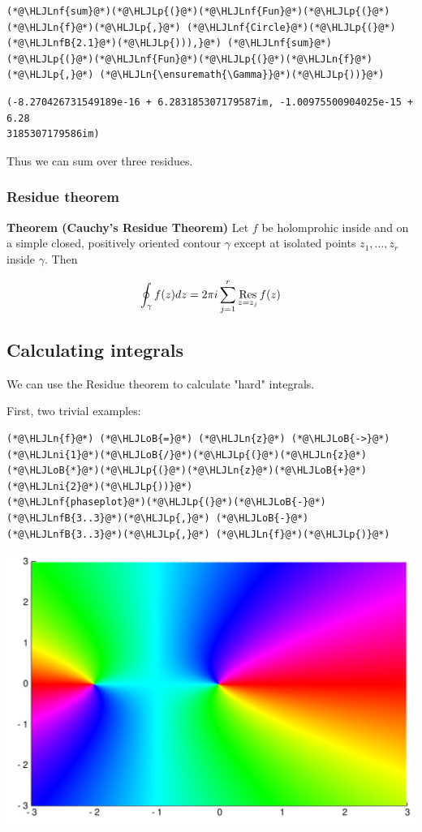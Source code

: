 \documentclass[12pt,a4paper]{article}
\newcommand{\HLJLn}[1]{#1}
\newcommand{\HLJLnf}[1]{\textcolor[RGB]{66,102,213}{#1}}
\newcommand{\HLJLnfB}[1]{\textcolor[RGB]{59,151,46}{#1}}
\newcommand{\HLJLni}[1]{\textcolor[RGB]{59,151,46}{#1}}
\newcommand{\HLJLoB}[1]{\textcolor[RGB]{102,102,102}{\textbf{#1}}}
\newcommand{\HLJLp}[1]{#1}
\begin{document}
\begin{lstlisting}
(*@\HLJLnf{sum}@*)(*@\HLJLp{(}@*)(*@\HLJLnf{Fun}@*)(*@\HLJLp{(}@*)(*@\HLJLn{f}@*)(*@\HLJLp{,}@*) (*@\HLJLnf{Circle}@*)(*@\HLJLp{(}@*)(*@\HLJLnfB{2.1}@*)(*@\HLJLp{))),}@*) (*@\HLJLnf{sum}@*)(*@\HLJLp{(}@*)(*@\HLJLnf{Fun}@*)(*@\HLJLp{(}@*)(*@\HLJLn{f}@*)(*@\HLJLp{,}@*) (*@\HLJLn{\ensuremath{\Gamma}}@*)(*@\HLJLp{))}@*)
\end{lstlisting}

\begin{lstlisting}
(-8.270426731549189e-16 + 6.283185307179587im, -1.00975500904025e-15 + 6.28
3185307179586im)
\end{lstlisting}


Thus we can sum over three residues.

\subsubsection{Residue theorem}
\textbf{Theorem (Cauchy's Residue Theorem)} Let $f$ be holomprohic inside and on a simple closed, positively oriented contour $\gamma$ except at isolated points $z_1, \ldots, z_r$ inside $\gamma$. Then

\[
\oint_\gamma f(z) dz = 2 \pi i \sum_{j=1}^r {\underset{z = z_j}{\rm Res}}\, f(z)
\]
\subsection{Calculating integrals}
We can use the Residue theorem to calculate "hard" integrals.

First, two trivial examples:


\begin{lstlisting}
(*@\HLJLn{f}@*) (*@\HLJLoB{=}@*) (*@\HLJLn{z}@*) (*@\HLJLoB{->}@*) (*@\HLJLni{1}@*)(*@\HLJLoB{/}@*)(*@\HLJLp{(}@*)(*@\HLJLn{z}@*)(*@\HLJLoB{*}@*)(*@\HLJLp{(}@*)(*@\HLJLn{z}@*)(*@\HLJLoB{+}@*)(*@\HLJLni{2}@*)(*@\HLJLp{))}@*)
(*@\HLJLnf{phaseplot}@*)(*@\HLJLp{(}@*)(*@\HLJLoB{-}@*)(*@\HLJLnfB{3..3}@*)(*@\HLJLp{,}@*) (*@\HLJLoB{-}@*)(*@\HLJLnfB{3..3}@*)(*@\HLJLp{,}@*) (*@\HLJLn{f}@*)(*@\HLJLp{)}@*)
\end{lstlisting}

\includegraphics[width=\linewidth]{figures/Lecture3_9_1.pdf}
\end{document}
